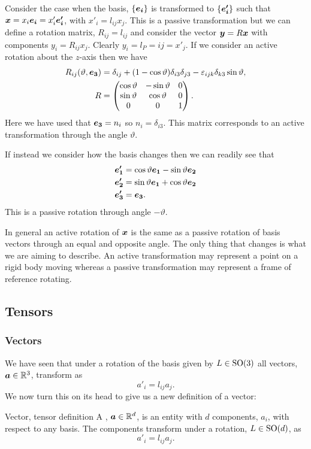 Consider the case when the basis, \(\{\bm{e_{i}}\}\) is transformed to \(\{\bm{e'_i}\}\) such that \(\bm{x} = x_i\bm{e_{i}} = x'_i\bm{e'_i}\), with \(x'_i = l_{ij}x_j\).
This is a passive transformation but we can define a rotation matrix, \(R_{ij} = l_{ij}\) and consider the vector \(\bm{y} = R\bm{x}\) with components \(y_i = R_{ij}x_j\).
Clearly \(y_i = l_P={ij} = x'_j\).
If we consider an active rotation about the \(z\)-axis then we have
\begin{align*}
    R_{ij}(\vartheta, \bm{e_{3}}) &= \delta_{ij} + (1 - \cos\vartheta)\delta_{i3}\delta_{j3} - \varepsilon_{ijk}\delta_{k3}\sin\vartheta,\\
    R &= 
    \begin{pmatrix}
        \cos\vartheta & -\sin\vartheta & 0\\
        \sin\vartheta & \cos\vartheta & 0\\
        0 & 0 & 1
    \end{pmatrix}
    .
\end{align*}
Here we have used that \(\bm{e_{3}} = n_i\) so \(n_i = \delta_{i3}\).
This matrix corresponds to an active transformation through the angle \(\vartheta\).

If instead we consider how the basis changes then we can readily see that
\begin{align*}
    \bm{e'_1} &= \cos\vartheta\bm{e_{1}} - \sin\vartheta\bm{e_{2}}\\
    \bm{e'_2} &= \sin\vartheta\bm{e_{1}} + \cos\vartheta\bm{e_{2}}\\
    \bm{e'_3} &= \bm{e_{3}}.
\end{align*}
This is a passive rotation through angle \(-\vartheta\).

In general an active rotation of \(\bm{x}\) is the same as a passive rotation of basis vectors through an equal and opposite angle.
The only thing that changes is what we are aiming to describe.
An active transformation may represent a point on a rigid body moving whereas a passive transformation may represent a frame of reference rotating.

\subsection{Tensors}
\subsubsection{Vectors}
We have seen that under a rotation of the basis given by \(L\in\mathrm{SO}(3)\) all vectors, \(\bm{a}\in\mathbb{R}^3\), transform as
\[a'_i = l_{ij}a_j.\]
We now turn this on its head to give us a new definition of a vector:
\begin{definition}{Vector, tensor definition}{}
    A , \(\bm{a}\in\mathbb{R}^d\), is an entity with \(d\) components, \(a_i\), with respect to any basis.
    The components transform under a rotation, \(L\in\mathrm{SO}(d)\), as
    \[a'_i = l_{ij}a_j.\]
\end{definition}


